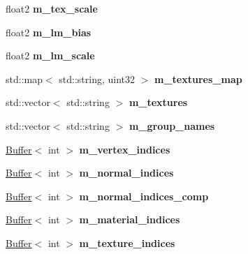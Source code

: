 \begin{DoxyCompactItemize}
float2 {\bfseries m\+\_\+tex\+\_\+scale}
\item 
\mbox{\label{class_mesh_storage_a8d3dc84e7724b954ba11895aeafc0e6f}} 
float2 {\bfseries m\+\_\+lm\+\_\+bias}
\item 
\mbox{\label{class_mesh_storage_ab5e805db0a321e1c5f1b8fc8c07254d3}} 
float2 {\bfseries m\+\_\+lm\+\_\+scale}
\item 
\mbox{\label{class_mesh_storage_a88e308718df7fdbecd7289d3970effc2}} 
std\+::map$<$ std\+::string, uint32 $>$ {\bfseries m\+\_\+textures\+\_\+map}
\item 
\mbox{\label{class_mesh_storage_a537f80e9f36be23eae3c58b6e5a54b2e}} 
std\+::vector$<$ std\+::string $>$ {\bfseries m\+\_\+textures}
\item 
\mbox{\label{class_mesh_storage_a2fe89492e0a32a3b1f238029e1edde59}} 
std\+::vector$<$ std\+::string $>$ {\bfseries m\+\_\+group\+\_\+names}
\item 
\mbox{\label{class_mesh_storage_a47b675d399d9b76bdadf77be6db0d137}} 
\hyperlink{class_buffer}{Buffer}$<$ int $>$ {\bfseries m\+\_\+vertex\+\_\+indices}
\item 
\mbox{\label{class_mesh_storage_ab75ce7f9d3f2b16ece26fb373ec55fc6}} 
\hyperlink{class_buffer}{Buffer}$<$ int $>$ {\bfseries m\+\_\+normal\+\_\+indices}
\item 
\mbox{\label{class_mesh_storage_a78dba9a85aa9951ff76e953a8c69a473}} 
\hyperlink{class_buffer}{Buffer}$<$ int $>$ {\bfseries m\+\_\+normal\+\_\+indices\+\_\+comp}
\item 
\mbox{\label{class_mesh_storage_a8e342b358331e03b2034d07bbfda1d5a}} 
\hyperlink{class_buffer}{Buffer}$<$ int $>$ {\bfseries m\+\_\+material\+\_\+indices}
\item 
\mbox{\label{class_mesh_storage_afd73be39c45e23b884e1dded4db7eebb}} 
\hyperlink{class_buffer}{Buffer}$<$ int $>$ {\bfseries m\+\_\+texture\+\_\+indices}
\item 

\end{DoxyCompactItemize}
